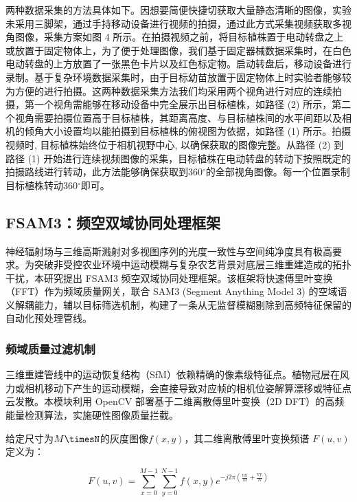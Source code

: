 \documentclass[preprint,12pt]{elsarticle}
\begin{document}
两种数据采集的方法具体如下。因想要简便快捷切获取大量静态清晰的图像，实验未采用三脚架，通过手持移动设备进行视频的拍摄，通过此方式采集视频获取多视角图像，采集方案如图 4 所示。在拍摄视频之前，将目标植株置于电动转盘之上或放置于固定物体上，为了便于处理图像，我们基于固定器械数据采集时，在白色电动转盘的上方放置了一张黑色卡片以及红色标定物。启动转盘后，移动设备进行录制。基于复杂环境数据采集时，由于目标幼苗放置于固定物体上时实验者能够较为方便的进行拍摄。这两种数据采集方法我们均采用两个视角进行对应的连续拍摄，第一个视角需能够在移动设备中完全展示出目标植株，如路径 (2) 所示，第二个视角需要拍摄位置高于目标植株，其距离高度、与目标植株间的水平间距以及相机的倾角大小设置均以能拍摄到目标植株的俯视图为依据，如路径 (1) 所示。拍摄视频时, 目标植株始终位于相机视野中心,  以确保获取的图像完整。从路径 (2) 到路径 (1) 开始进行连续视频图像的采集，目标植株在电动转盘的转动下按照既定的拍摄路线进行转动，此方法能够确保获取到360$^\circ$的全部视角图像。每一个位置录制目标植株转动360$^\circ$即可。

\subsection{FSAM3：频空双域协同处理框架}

神经辐射场与三维高斯溅射对多视图序列的光度一致性与空间纯净度具有极高要求。为突破非受控农业环境中运动模糊与复杂农艺背景对底层三维重建造成的拓扑干扰，本研究提出 FSAM3 频空双域协同处理框架。该框架将快速傅里叶变换（FFT）作为频域质量网关，联合 SAM3 (Segment Anything Model 3) 的空域语义解耦能力，辅以目标筛选机制，构建了一条从无监督模糊剔除到高频特征保留的自动化预处理管线。

\subsubsection{频域质量过滤机制}

三维重建管线中的运动恢复结构（SfM）依赖精确的像素级特征点。植物冠层在风力或相机移动下产生的运动模糊，会直接导致对应帧的相机位姿解算漂移或特征点云发散。本模块利用 OpenCV 部署基于二维离散傅里叶变换（2D DFT）的高频能量检测算法，实施硬性图像质量拦截。

给定尺寸为$M \timesN$的灰度图像$f\left(x,y\right)$，其二维离散傅里叶变换频谱 $F\left(u,v\right)$ 定义为：

\begin{equation}
F\left(u,v\right)=\sum_{x=0}^{M-1} \sum_{y=0}^{N-1} f\left(x,y\right){e}^{-j2\pi\left(\frac{\mathrm{ux}}{M}+\frac{\mathrm{vy}}{N}\right)}
\end{equation}
\end{document}
